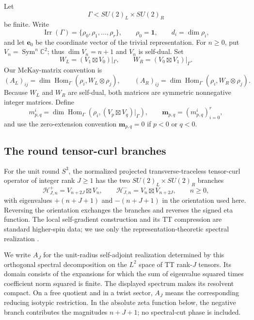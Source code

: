 \documentclass[11pt]{article}
\theoremstyle{definition}
\DeclareMathOperator{\Sym}{Sym}
\DeclareMathOperator{\Hom}{Hom}
\DeclareMathOperator{\Irr}{Irr}
\newcommand{\C}{\mathbb C}
\newcommand{\one}{\mathbf 1}
\begin{document}
Let
\[
 \Gamma< SU(2)_L\times SU(2)_R
\]
be finite.  Write
\[
 \Irr(\Gamma)=\{\rho_0,\rho_1,\ldots,\rho_r\},
 \qquad \rho_0=\one,
 \qquad d_i=\dim\rho_i,
\]
and let $\boldsymbol e_0$ be the coordinate vector of the trivial
representation.  For $n\geq0$, put $V_n=\Sym^n\C^2$; thus
$\dim V_n=n+1$ and $V_n$ is self-dual.  Set
\[
 W_L=(V_1\boxtimes V_0)|_\Gamma,
 \qquad
 W_R=(V_0\boxtimes V_1)|_\Gamma .
\]
Our McKay-matrix convention is
\begin{equation}
 (A_L)_{ij}
 =\dim\Hom_\Gamma(\rho_i,W_L\otimes\rho_j),
 \qquad
 (A_R)_{ij}
 =\dim\Hom_\Gamma(\rho_i,W_R\otimes\rho_j).
 \label{eq:McKay-matrices}
\end{equation}
Because $W_L$ and $W_R$ are self-dual, both matrices are symmetric
nonnegative integer matrices.  Define
\begin{equation}
 m_{p,q}^i
 =\dim\Hom_\Gamma(\rho_i,(V_p\boxtimes V_q)|_\Gamma),
 \qquad
 \boldsymbol m_{p,q}=(m_{p,q}^i)_{i=0}^r ,
 \label{eq:multiplicity-grid}
\end{equation}
and use the zero-extension convention
$\boldsymbol m_{p,q}=0$ if $p<0$ or $q<0$.

\subsection{The round tensor-curl branches}

For the unit round $S^3$, the normalized projected
transverse-traceless tensor-curl operator of integer rank $J\geq1$ has
the two $SU(2)_L\times SU(2)_R$ branches
\begin{equation}
 \mathcal H_{J,n}^{+}=V_{n+2J}\boxtimes V_n,
 \qquad
 \mathcal H_{J,n}^{-}=V_n\boxtimes V_{n+2J},
 \qquad n\geq0,
 \label{eq:TT-branches}
\end{equation}
with eigenvalues $+(n+J+1)$ and $-(n+J+1)$ in the orientation used
here.  Reversing the orientation exchanges the branches and reverses
the signed eta function.  The local self-gradient construction and its
TT compression are standard higher-spin data; we use only the
representation-theoretic spectral realization
\cite{Homma2001,HommaTomihisa2021}.

We write $A_J$ for the unit-radius self-adjoint realization determined
by this orthogonal spectral decomposition on the $L^2$ space of TT
rank-$J$ tensors.  Its domain consists of the expansions for which the
sum of eigenvalue squared times coefficient norm squared is finite.
The displayed spectrum makes its resolvent compact.  On a free quotient
and in a twist sector, $A_J$ means the corresponding reducing
isotypic restriction.  In the absolute zeta function below, the
negative branch contributes the magnitudes $n+J+1$; no spectral-cut
phase is included.
\end{document}
